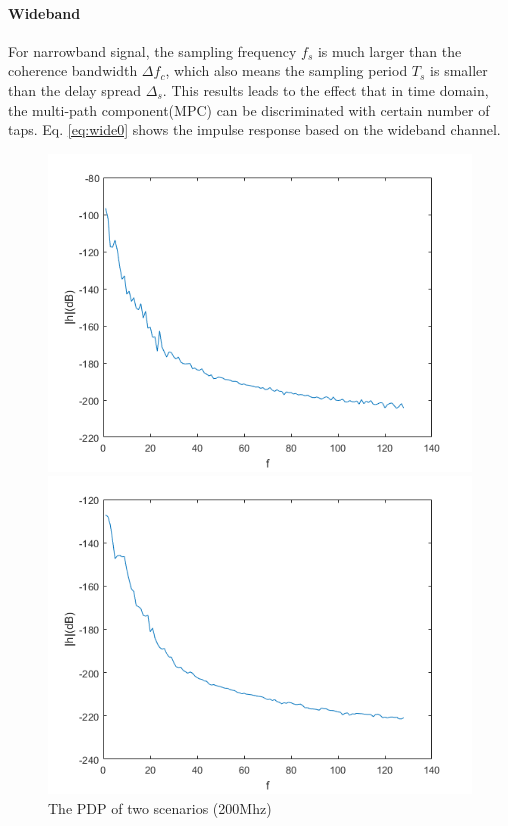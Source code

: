 \documentclass[a4paper]{article}
\begin{document}
	\paragraph{Wideband} For narrowband signal, the sampling frequency $f_s$ is much larger than the coherence bandwidth $\Delta f_c$, which also means the sampling period $T_s$ is smaller than the delay spread $\Delta_s$. This results leads to the effect that in time domain, the multi-path component(MPC) can be discriminated with certain number of taps. Eq. \ref{eq:wide0} shows the impulse response based on the wideband channel.
	
    \begin{figure}[h]
		\begin{minipage}[t]{0.5\linewidth}
			\centering
			\includegraphics[scale=0.5]{lab1/PDP_Los.png}
			\vspace{-0.5cm}
			\centering
		\end{minipage}
		\begin{minipage}[t]{0.5\linewidth}
			\centering
			\includegraphics[scale=0.5]{lab1/PDP_NLos.png}
			\vspace{-0.5cm}
			\centering
		\end{minipage}
		\caption{The PDP of two scenarios (200Mhz)}
        \label{fig:pdp200}
	\end{figure}
    
\end{document}
